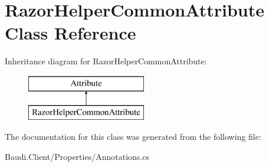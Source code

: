 \hypertarget{class_razor_helper_common_attribute}{}\section{Razor\+Helper\+Common\+Attribute Class Reference}
\label{class_razor_helper_common_attribute}
Inheritance diagram for Razor\+Helper\+Common\+Attribute\+:\begin{figure}[H]
\begin{center}
\leavevmode
\includegraphics[height=2.000000cm]{class_razor_helper_common_attribute}
\end{center}
\end{figure}


The documentation for this class was generated from the following file\+:\begin{DoxyCompactItemize}
\item 
Baudi.\+Client/\+Properties/Annotations.\+cs\end{DoxyCompactItemize}
